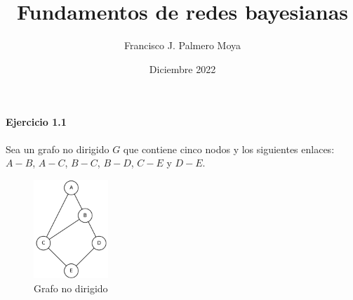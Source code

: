 \documentclass[12pt,a4paper]{article}
\title{Fundamentos de redes bayesianas}
\author{Francisco J. Palmero Moya}
\date{Diciembre 2022}
\begin{document}
\renewcommand{\tablename}{Tabla}

\maketitle

\paragraph{Ejercicio 1.1}
Sea un grafo no dirigido $G$ que contiene cinco nodos y los siguientes enlaces: \\
$A-B$, $A-C$, $B-C$, $B-D$, $C-E$ y $D-E$.

\begin{figure}[h!]
    \centering
    \includegraphics[width=0.25\textwidth]{graph1.png}
    \caption{Grafo no dirigido}
    \label{fig:ejercicio1}
\end{figure}
\end{document}
